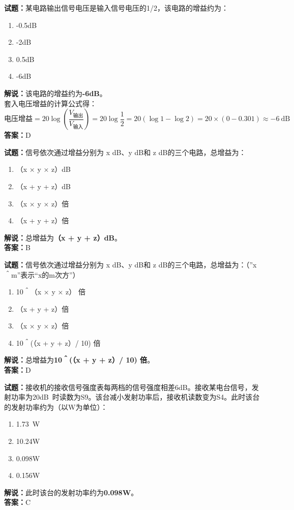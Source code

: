\documentclass{ctexbook}
\begin{document}
\noindent\textbf{试题：}某电路输出信号电压是输入信号电压的1/2，该电路的增益约为：
\begin{enumerate}[leftmargin=3em]
\item -0.5dB
\item -2dB
\item 0.5dB
\item -6dB
\end{enumerate}
\noindent\textbf{解说：}该电路的增益约为\textbf{-6dB}。\\
套入电压增益的计算公式得：
$$\mbox{电压增益}=20 \log \left( {\frac{V_{ \mbox{输出} }}{V_{ \mbox{输入} }}} \right)=20 \log \frac{1}{2}=20 \left( \log 1 - \log 2 \right) = 20 \times \left( 0 - 0.301 \right) \approx -6 \ \mathrm{dB}$$
\noindent\textbf{答案：}D



\bigskip


\noindent\textbf{试题：}信号依次通过增益分别为 x dB、y dB和 z dB的三个电路，总增益为：
\begin{enumerate}[leftmargin=3em]
\item （x × y × z）dB
\item （x + y + z）dB
\item （x × y × z）倍
\item （x + y + z）倍
\end{enumerate}
\noindent\textbf{解说：}总增益为\textbf{（x + y + z）dB}。\\\noindent\textbf{答案：}B




\bigskip


\noindent\textbf{试题：}信号依次通过增益分别为 x dB、y dB和 z dB的三个电路，总增益为：（”x＾m”表示“x的m次方”）
\begin{enumerate}[leftmargin=3em]
\item 10＾（x × y × z） 倍
\item （x + y + z）倍
\item （x × y × z）倍
\item 10＾(（x + y + z）/ 10) 倍%
\end{enumerate}
\noindent\textbf{解说：}总增益为\textbf{10＾(（x + y + z）/ 10) 倍}。\\\noindent\textbf{答案：}D



\bigskip


\noindent\textbf{试题：}接收机的接收信号强度表每两档的信号强度相差6dB。接收某电台信号，发射功率为20\unit[qualifier-mode=combine]{\deci\bel{}}时读数为S9。该台减小发射功率后，接收机读数变为S4。此时该台的发射功率约为（以W为单位）：
\begin{enumerate}[leftmargin=3em]
\item \SI{1.73}{\W}
\item 10.24W
\item 0.098W
\item 0.156W
\end{enumerate}
\noindent\textbf{解说：}此时该台的发射功率约为\textbf{0.098W}。\\\noindent\textbf{答案：}C
\end{document}
